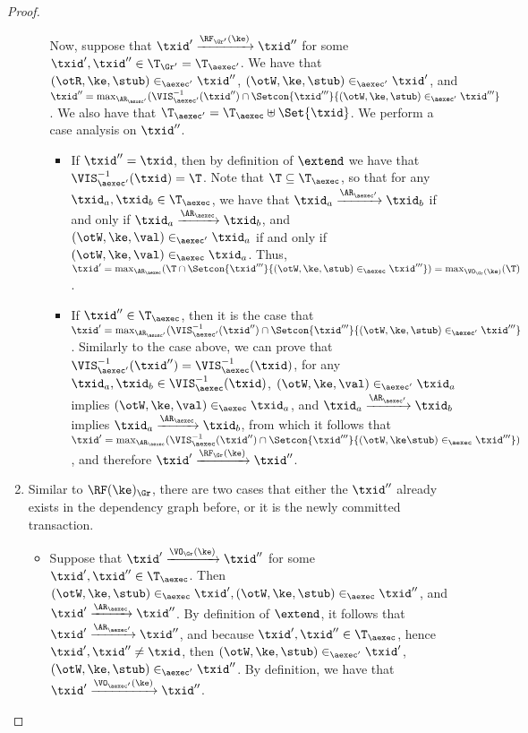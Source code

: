 \begin{proof}
\begin{enumerate}
\begin{itemize}
Now, suppose that $\txid' \xrightarrow{\RF_{\Gr'}(\ke)} \txid''$ for some $\txid', \txid'' \in \T_{\Gr'} = 
\T_{\aexec'}$. We have that $ (\otR, \ke, \stub) \in_{\aexec'} \txid''$, 
$(\otW, \ke, \stub) \in_{\aexec'} \txid'$, and $\txid'' = \max_{\AR_{\aexec'}}(\VIS_{\aexec'}^{-1}(\txid'') 
\cap \Setcon{ \txid''' }{ (\otW, \ke, \stub) \in_{\aexec'} \txid'''}$. 
We also have that $\T_{\aexec'} = \T_{\aexec} \uplus \Set{\txid}$. We perform a case 
analysis on $\txid''$. 

\begin{itemize}
\item If $\txid'' = \txid$, then by definition of $\extend$ we have that 
$\VIS^{-1}_{\aexec'}(\txid) = \T$. Note that $\T \subseteq \T_{\aexec}$, so that 
for any $\txid_{a}, \txid_{b} \in \T_{\aexec}$, we have that $\txid_{a} \xrightarrow{\AR_{\aexec'}} \txid_{b}$ 
if and only if $\txid_{a} \xrightarrow{\AR_{\aexec}} \txid_{b}$, 
and $(\otW, \ke, \val) \in_{\aexec'} \txid_{a}$ if and only if $(\otW, \ke, \val) \in_{\aexec} \txid_{a}$. 
Thus, $\txid' = \max_{\AR_{\aexec}}(\T 
\cap \Setcon{\txid''' }{ (\otW, \ke, \stub) \in_{\aexec} \txid'''}) = \max_{\VO_{\Gr}(\ke)}(\T)$. 

\item If $\txid'' \in \T_{\aexec}$, then it is the case that 
    $\txid' = \max_{\AR_{\aexec'}}(\VIS^{-1}_{\aexec'}(\txid'') \cap \Setcon{ \txid''' }{ (\otW, \ke, \stub) \in_{\aexec'} \txid'''}$. 
Similarly to the case above, we can prove that $\VIS^{-1}_{\aexec'}(\txid'') = \VIS^{-1}_{\aexec}(\txid)$, 
for any $\txid_{a}, \txid_{b} \in \VIS^{-1}_{\aexec}(\txid)$, $(\otW, \ke, \val) \in_{\aexec'} \txid_{a}$ 
implies $(\otW, \ke, \val) \in_{\aexec} \txid_{a}$, and $\txid_{a} \xrightarrow{\AR_{\aexec'}} \txid_{b}$ 
implies $\txid_{a} \xrightarrow{\AR_{\aexec}} \txid_{b}$, from which it follows that 
$\txid' = \max_{\AR_{\aexec}}(\VIS^{-1}_{\aexec}(\txid'') \cap \Setcon{ \txid''' }{ (\otW, \ke \stub) \in_{\aexec} \txid'''})$, 
and therefore $\txid' \xrightarrow{\RF_{\Gr}(\ke)} \txid''$.
\end{itemize}
\end{itemize}

\item 
Similar to \( \RF(\ke)_{\Gr} \), there are two cases that either the \( \txid'' \) already exists in the dependency graph before,
or it is the newly committed transaction.
\begin{itemize}
\item Suppose that $\txid' \xrightarrow{\VO_{\Gr}(\ke)} \txid''$ for some $\txid', \txid'' \in \T_{\aexec}$. 
Then $(\otW,\ke,\stub) \in_{\aexec} \txid', (\otW, \ke, \stub) \in_{\aexec} \txid''$, and $\txid' \xrightarrow{\AR_{\aexec}} \txid''$. 
By definition of $\extend$, it follows that $\txid' \xrightarrow{\AR_{\aexec'}} \txid''$, and because 
$\txid', \txid'' \in \T_{\aexec}$, hence $\txid', \txid'' \neq \txid$, then 
$(\otW,\ke, \stub) \in_{\aexec'} \txid'$, $(\otW, \ke, \stub) \in_{\aexec'} \txid''$. By definition, 
we have that $\txid' \xrightarrow{\VO_{\aexec'}(\ke)} \txid''$.


\end{itemize}
\end{enumerate}
\end{proof}
